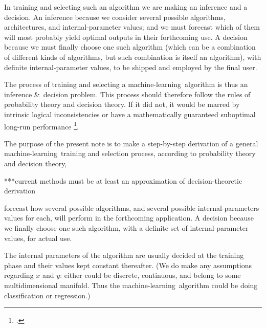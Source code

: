 \documentclass[\ifafour a4paper,12pt,\else a5paper,10pt,\fi%
onecolumn,oneside,article,%
british%
]{memoir}
\theoremstyle{remark}
\theoremstyle{innote}
\newcommand*{\citep}{\footcites}
\newcommand*{\amp}{\&}
\renewcommand*{\|}[1][]{\nonscript\:#1\vert\nonscript\:\mathopen{}}
\newcommand*{\chaps}{chs}%
\newcommand*{\eg}{{e.g.}}
\newcommand*{\ml}{machine-learning}
\begin{document}
In training and selecting such an algorithm we are making an inference and
a decision. An inference because we consider several possible algorithms,
architectures, and internal-parameter values; and we must forecast which of
them will most probably yield optimal outputs in their forthcoming use. A
decision because we must finally choose one such algorithm (which can be a
combination of different kinds of algorithms, but such combination is
itself an algorithm), with definite internal-parameter values, to be
shipped and employed by the final user.

The process of training and selecting a \ml\ algorithm is thus an inference
\amp\ decision problem. This process should therefore follow the rules of
probability theory and decision theory. If it did not, it would be marred
by intrinsic logical inconsistencies or have a mathematically guaranteed
suboptimal long-run performance
\citep{prattetal1995_r1996,berger1980_r1985,raiffaetal1961_r2000,bernardoetal1994_r2000}[esp.\
\chaps~13--14]{jaynes1994_r2003}{degroot1970_r2004}[for early works
see][]{wald1950_r1964,savage1954_r1972,neumannetal1944_r1955,bernoulli1738}[for
introductions and summaries:][]{good1952,prattetal1964,north1968}[and the
brilliant][]{raiffa1968_r1970}[it is known that human beings often do not
follow rational decision theory (nor logic for that matter); this is why
logic, probability theory, decision theory are \emph{normative}, not
descriptive, theories; see \eg][]{tversky1975,tverskyetal1981}.

The purpose of the present note is to make a step-by-step derivation of a
general \ml\ training and selection process, according to probability
theory and decision theory,

***current methods must be at least an approximation of decision-theoretic derivation


forecast how
several possible algorithms, and several possible internal-parameters
values for each, will perform in the forthcoming application. A decision
because we finally choose one such algorithm, with a definite set of
internal-parameter values, for actual use.





The internal
parameters of the algorithm are usually decided at the training phase and
their values kept constant thereafter. (We do make any assumptions
regarding $x$ and $y$: either could be discrete, continuous, and belong to
some multidimensional manifold. Thus the \ml\ algorithm could be doing
classification or regression.)
\end{document}
